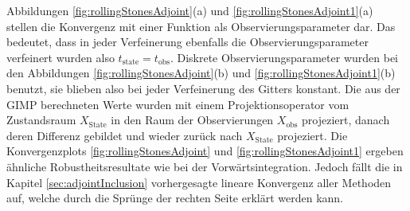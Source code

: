Abbildungen \ref{fig:rollingStonesAdjoint}(a) und \ref{fig:rollingStonesAdjoint1}(a) stellen die Konvergenz mit einer Funktion als Observierungsparameter dar. Das bedeutet, dass in jeder Verfeinerung ebenfalls die Observierungsparameter verfeinert wurden also $t_{\text{state}} = t_{\text{obs}}$. Diskrete Observierungsparameter wurden bei den Abbildungen \ref{fig:rollingStonesAdjoint}(b) und \ref{fig:rollingStonesAdjoint1}(b) benutzt, sie blieben also bei jeder Verfeinerung des Gitters konstant. Die aus der GIMP berechneten Werte wurden mit einem Projektionsoperator vom Zustandsraum $X_{\text{State}}$ in den Raum der Observierungen $X_{\text{obs}}$ projeziert, danach deren Differenz gebildet und wieder zurück nach $X_{\text{State}}$ projeziert.
Die Konvergenzplots \ref{fig:rollingStonesAdjoint} und \ref{fig:rollingStonesAdjoint1} ergeben ähnliche Robustheitsresultate wie bei der Vorwärtsintegration. 
Jedoch fällt die in Kapitel \ref{sec:adjointInclusion} vorhergesagte lineare Konvergenz aller Methoden auf, welche durch die Sprünge der rechten Seite erklärt werden kann.


